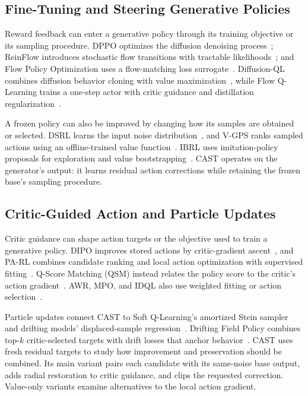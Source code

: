 \subsection{Fine-Tuning and Steering Generative Policies}

Reward feedback can enter a generative policy through its training objective
or its sampling procedure. DPPO optimizes the diffusion denoising
process~\cite{ren2024dppo}; ReinFlow introduces stochastic flow transitions
with tractable likelihoods~\cite{reinflow2025}; and Flow Policy Optimization
uses a flow-matching loss surrogate~\cite{mcallister2025flowmatchingpolicygradients}.
Diffusion-QL combines diffusion behavior cloning with value
maximization~\cite{wang2023diffusionql}, while Flow Q-Learning trains a
one-step actor with critic guidance and distillation
regularization~\cite{park2025fql}.

A frozen policy can also be improved by changing how its samples are
obtained or selected. DSRL learns the input noise
distribution~\cite{wagenmaker2025dsrl}, and V-GPS ranks sampled actions
using an offline-trained value function~\cite{nakamoto2025vgps}. IBRL
uses imitation-policy proposals for exploration and value
bootstrapping~\cite{hu2024ibrl}. CAST operates on the generator's output:
it learns residual action corrections while retaining the frozen base's
sampling procedure.

\subsection{Critic-Guided Action and Particle Updates}

Critic guidance can shape action targets or the objective used to train
a generative policy. DIPO improves stored actions by critic-gradient
ascent~\cite{dipo2024}, and PA-RL combines candidate ranking and local
action optimization with supervised fitting~\cite{mark2024parl}.
Q-Score Matching (QSM) instead relates the policy score to the critic's
action gradient~\cite{psenka2024qsm}.
AWR, MPO, and IDQL also use weighted fitting or action
selection~\cite{peng2019awr,abdolmaleki2018mpo,hansenestruch2023idql}.

Particle updates connect CAST to Soft Q-Learning's amortized Stein
sampler~\cite{haarnoja2017sql} and drifting models' displaced-sample
regression~\cite{deng2026drifting}. Drifting Field Policy combines top-$k$
critic-selected targets with drift losses that anchor behavior~\cite{dfp2026}.
CAST uses fresh residual targets to study how improvement and preservation
should be combined. Its main variant pairs each candidate with its
same-noise base output, adds radial restoration to critic guidance, and
clips the requested correction. Value-only variants examine alternatives
to the local action gradient.

